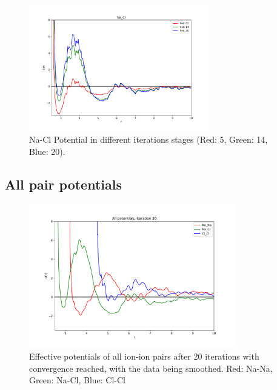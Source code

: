 \documentclass[10pt]{article}
\begin{document}
        

        \begin{figure}[H]
            \centering
            \includegraphics[width = 0.7\textwidth]{iters_conv_Na_Cl.pdf}
            \caption{Na-Cl Potential in different iterations stages (Red: 5, Green: 14, Blue: 20).}
            \label{fig:Na-Cl-iter}
        \end{figure}


    \subsection{All pair potentials}
        
        \begin{figure}[H]
            \centering
            \includegraphics[width = 0.8\textwidth]{iters_all_20_smoothed.pdf}
            \caption{Effective potentials of all ion-ion pairs after 20 iterations with convergence reached, with the data being smoothed. Red: Na-Na, Green: Na-Cl, Blue: Cl-Cl}
            \label{fig:allpot_smooth}
        \end{figure}
\end{document}
